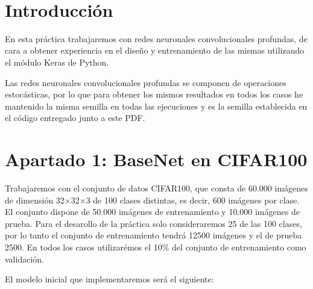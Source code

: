 \documentclass[12pt, spanish]{article}
\makeatletter
\let\thedate\@date
\makeatother
\begin{document}
\begin{titlepage}
    {\large \thedate}\\[0.5cm]
    {\doclicenseThis}

    \vfill

\end{titlepage}


\tableofcontents
\pagebreak



\section*{Introducción}

En esta práctica trabajaremos con redes neuronales convolucionales profundas, de cara a obtener experiencia en el diseño y entrenamiento de las mismas utilizando el módulo Keras de Python.

Las redes neuronales convolucionales profundas se componen de operaciones estocásticas, por lo que para obtener los mismos resultados en todos los casos he mantenido la misma semilla en todas las ejecuciones y es la semilla establecida en el código entregado junto a este PDF.

\section{Apartado 1: BaseNet en CIFAR100}

Trabajaremos con el conjunto de datos CIFAR100, que consta de 60.000 imágenes de dimensión 32$\times$32$\times$3 de 100 clases distintas, es decir, 600 imágenes por clase. El conjunto dispone de 50.000 imágenes de entrenamiento y 10.000 imágenes de prueba. Para el desarollo de la práctica solo consideraremos 25 de las 100 clases, por lo tanto el conjunto de entrenamiento tendrá 12500 imágenes y el de prueba 2500. En todos los casos utilizarémos el 10\% del conjunto de entrenamiento como validación.


El modelo inicial que implementaremos será el siguiente:
\end{document}
